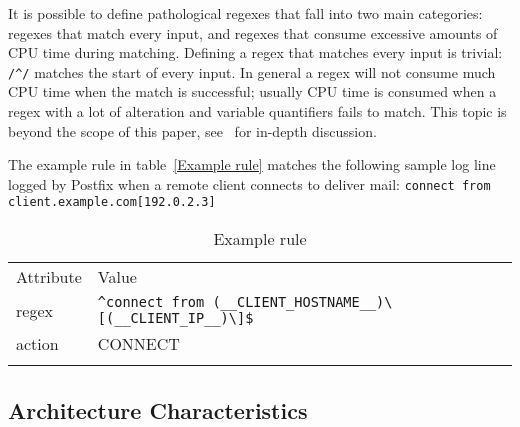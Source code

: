 \documentclass{svmult}
\newcommand{\tabletopline}[0]{%
    \hline%
    \noalign{\smallskip}%
}
\newcommand{\tablebottomline}[0]{%
    \noalign{\smallskip}%
    \hline%
}
\newcommand{\tablemiddleline}[0]{%
    \noalign{\smallskip}%
    \hline%
    \noalign{\smallskip}%
}
\newcommand{\refwithlabel}[2]{%
    #1~\vref{#2}%
}
\newcommand{\tableref}[1]{%
    \refwithlabel{table}{#1}%
}
\newcommand{\daemon}[1]{%
    \texttt{postfix/#1}%
}
\newcommand{\tab}[0]{%
    \hspace*{2em}%
}
\begin{document}
It is possible to define pathological regexes that fall into two main
categories: regexes that match every input, and regexes that consume
excessive amounts of CPU time during matching.  Defining a regex that
matches every input is trivial: \verb!/^/! matches the start of every
input.  In general a regex will not consume much CPU time when the match is
successful; usually CPU time is consumed when a regex with a lot of
alteration and variable quantifiers fails to match.  This topic is beyond
the scope of this paper, see~\cite{mastering-regular-expressions} for
in-depth discussion.

The example rule in \tableref{Example rule} matches the following sample
log line logged by Postfix when a remote client connects to deliver mail:
\newline{}\tab{}\verb!connect from client.example.com[192.0.2.3]!

\begin{table}[htbp]
    \caption{Example rule}
    \empty{}\label{Example rule}
    \begin{tabular}[]{ll}
        \tabletopline{}%
        Attribute                 & Value                                            \\
        \tablemiddleline{}%
        regex                     & \verb!^connect from (__CLIENT_HOSTNAME__)\[(__CLIENT_IP__)\]$! \\
        action                    & CONNECT                                          \\
        \tablebottomline{}%
    \end{tabular}
\end{table}

\subsection{Architecture Characteristics}

\label{Architecture characteristics}
\end{document}
